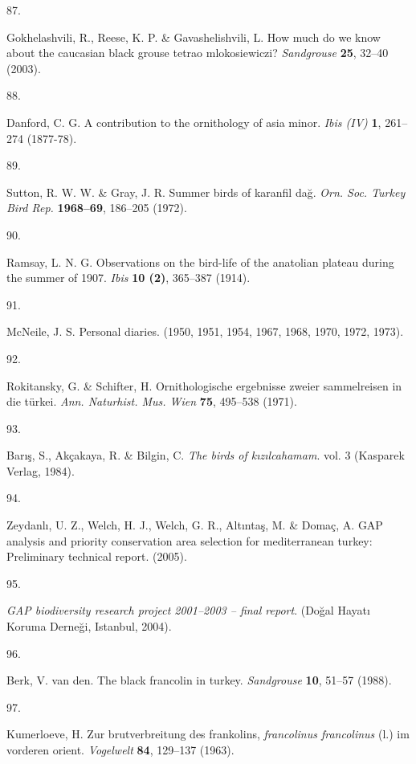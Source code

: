 \documentclass[
  letterpaper,
  DIV=11,
  numbers=noendperiod]{scrreprt}
\newlength{\cslhangindent}
\newlength{\csllabelwidth}
\newenvironment{CSLReferences}[2] %
 {\begin{list}{}{%
  \setlength{\itemindent}{0pt}
  \setlength{\leftmargin}{0pt}
  \setlength{\parsep}{0pt}
  \ifodd #1
   \setlength{\leftmargin}{\cslhangindent}
   \setlength{\itemindent}{-1\cslhangindent}
  \fi
  \setlength{\itemsep}{#2\baselineskip}}}
 {\end{list}}
\newcommand{\CSLLeftMargin}[1]{\parbox[t]{\csllabelwidth}{\strut#1\strut}}
\newcommand{\CSLRightInline}[1]{\parbox[t]{\linewidth - \csllabelwidth}{\strut#1\strut}}
\begin{document}
\begin{CSLReferences}{0}{0}
\CSLLeftMargin{87. }%
\CSLRightInline{Gokhelashvili, R., Reese, K. P. \& Gavashelishvili, L.
How much do we know about the caucasian black grouse tetrao
mlokosiewiczi? \emph{Sandgrouse} \textbf{25}, 32--40 (2003).}

\CSLLeftMargin{88. }%
\CSLRightInline{Danford, C. G. A contribution to the ornithology of asia
minor. \emph{Ibis (IV)} \textbf{1}, 261--274 (1877-78).}

\CSLLeftMargin{89. }%
\CSLRightInline{Sutton, R. W. W. \& Gray, J. R. Summer birds of karanfil
dağ. \emph{Orn. Soc. Turkey Bird Rep.} \textbf{1968--69}, 186--205
(1972).}

\CSLLeftMargin{90. }%
\CSLRightInline{Ramsay, L. N. G. Observations on the bird-life of the
anatolian plateau during the summer of 1907. \emph{Ibis} \textbf{10
(2)}, 365--387 (1914).}

\CSLLeftMargin{91. }%
\CSLRightInline{McNeile, J. S. Personal diaries. (1950, 1951, 1954,
1967, 1968, 1970, 1972, 1973).}

\CSLLeftMargin{92. }%
\CSLRightInline{Rokitansky, G. \& Schifter, H. Ornithologische
ergebnisse zweier sammelreisen in die türkei. \emph{Ann. Naturhist. Mus.
Wien} \textbf{75}, 495--538 (1971).}

\CSLLeftMargin{93. }%
\CSLRightInline{Barış, S., Akçakaya, R. \& Bilgin, C. \emph{The birds of
kızılcahamam}. vol. 3 (Kasparek Verlag, 1984).}

\CSLLeftMargin{94. }%
\CSLRightInline{Zeydanlı, U. Z., Welch, H. J., Welch, G. R., Altıntaş,
M. \& Domaç, A. GAP analysis and priority conservation area selection
for mediterranean turkey: Preliminary technical report. (2005).}

\CSLLeftMargin{95. }%
\CSLRightInline{\emph{GAP biodiversity research project 2001--2003 --
final report}. (Doğal Hayatı Koruma Derneği, Istanbul, 2004).}

\CSLLeftMargin{96. }%
\CSLRightInline{Berk, V. van den. The black francolin in turkey.
\emph{Sandgrouse} \textbf{10}, 51--57 (1988).}

\CSLLeftMargin{97. }%
\CSLRightInline{Kumerloeve, H. Zur brutverbreitung des frankolins,
\emph{francolinus francolinus} (l.) im vorderen orient. \emph{Vogelwelt}
\textbf{84}, 129--137 (1963).}


\end{CSLReferences}
\end{document}
